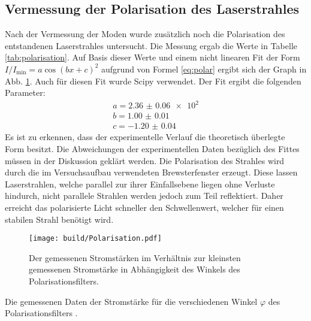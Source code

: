 \subsection{Vermessung der Polarisation des Laserstrahles}
Nach der Vermessung der Moden wurde zusätzlich noch die Polarisation des entstandenen Laserstrahles untersucht. Die Messung ergab die Werte in Tabelle \ref{tab:polarisation}. Auf Basis dieser Werte und einem nicht linearen Fit der Form $I/I_\text{min} = a  \cos(b x + c)^2$
 aufgrund von Formel \eqref{eq:polar} ergibt sich der Graph in Abb. \ref{fig:polarisation}. Auch für diesen Fit wurde Scipy \cite{scipy} verwendet. Der Fit ergibt die folgenden Parameter:
 \begin{gather*}
	a = \num{2.36(6)e2}\\
	b = \num{1.00(1)}\\
	c = \num{-1.20(4)}
	\end{gather*}
Es ist zu erkennen, dass der experimentelle Verlauf die theoretisch überlegte Form besitzt. Die Abweichungen der experimentellen Daten bezüglich des Fittes müssen in der Diskussion geklärt werden. Die Polarisation des Strahles wird durch die im Versuchsaufbau verwendeten Brewsterfenster erzeugt. Diese lassen Laserstrahlen, welche parallel zur ihrer Einfallsebene liegen ohne Verluste hindurch, nicht parallele Strahlen werden jedoch zum Teil reflektiert. Daher erreicht das polarisierte Licht schneller den Schwellenwert, welcher für einen stabilen Strahl benötigt wird. 

\begin{figure}
	\centering
	\texttt{[image: build/Polarisation.pdf]}
	\caption{Der gemessenen Stromstärken im Verhältnis zur kleinsten gemessenen Stromstärke in Abhängigkeit des Winkels des Polarisationsfilters.}
	\label{fig:polarisation}
\end{figure}


\begin{table}
	\centering
	\caption{Die gemessenen Daten der Stromstärke für die verschiedenen Winkel $\varphi$ des Polarisationsfilters .}
	
	\label{tab:polarisation}
\end{table}


